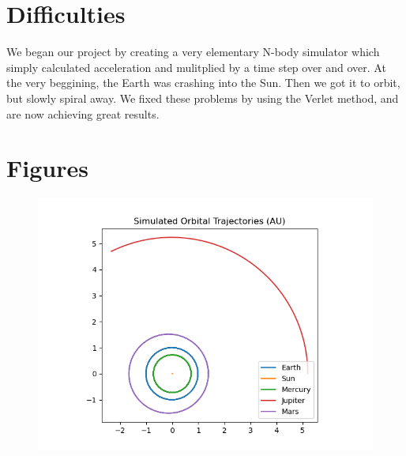 \documentclass[a4paper,12pt]{article} %
\numberwithin{equation}{section} %
\numberwithin{figure}{section} %
\begin{document}
\section{Difficulties}
\label{sec:difficulties}
We began our project by creating a very elementary N-body simulator which simply calculated acceleration and mulitplied by a time step over and over. At the very beggining, the Earth was crashing into the Sun. Then we got it to orbit, but slowly spiral away. We fixed these problems by using the Verlet method, and are now achieving great results.


\section{Figures}
\label{sec:figures}

\begin{figure}[h]
  \includegraphics[width=\linewidth]{trajectory.png}
  \label{fig:trajectory}
\end{figure}
\end{document}
